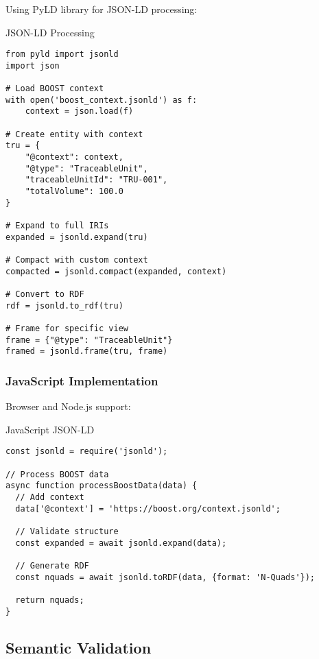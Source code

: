 Using PyLD library for JSON-LD processing:

\begin{pythonexample}{JSON-LD Processing}
\begin{verbatim}
from pyld import jsonld
import json

# Load BOOST context
with open('boost_context.jsonld') as f:
    context = json.load(f)

# Create entity with context
tru = {
    "@context": context,
    "@type": "TraceableUnit",
    "traceableUnitId": "TRU-001",
    "totalVolume": 100.0
}

# Expand to full IRIs
expanded = jsonld.expand(tru)

# Compact with custom context
compacted = jsonld.compact(expanded, context)

# Convert to RDF
rdf = jsonld.to_rdf(tru)

# Frame for specific view
frame = {"@type": "TraceableUnit"}
framed = jsonld.frame(tru, frame)
\end{verbatim}
\end{pythonexample}

\subsubsection{JavaScript Implementation}

Browser and Node.js support:

\begin{jsonexample}{JavaScript JSON-LD}
\begin{verbatim}
const jsonld = require('jsonld');

// Process BOOST data
async function processBoostData(data) {
  // Add context
  data['@context'] = 'https://boost.org/context.jsonld';
  
  // Validate structure
  const expanded = await jsonld.expand(data);
  
  // Generate RDF
  const nquads = await jsonld.toRDF(data, {format: 'N-Quads'});
  
  return nquads;
}
\end{verbatim}
\end{jsonexample}

\subsection{Semantic Validation}
\label{sec:semantic-validation}

